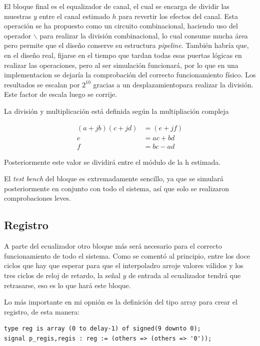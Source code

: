 \documentclass[11pt]{scrartcl} %
\begin{document}
\begin{preview}
El bloque final es el equalizador de canal, el cual se encarga de dividir las muestras $y$ entre el canal estimado $h$ para revertir los efectos del canal. Esta operación se ha propuesto como un circuito combinacional, haciendo uso del operador $\backslash$ para realizar la división combinacional, lo cual consume mucha área pero permite que el diseño conserve su estructura \emph{pipeline}. También habría que, en el diseño real, fijarse en el tiempo que tardan todas esas puertas lógicas en realizar las operaciones, pero al ser simulación funcionará, por lo que en una implementacion se dejaría la comprobación del correcto funcionamiento físico. Los resultados se escalan por $2^{10}$ gracias a un desplazamientopara realizar la división. Este factor de escala luego se corrije.

La división y multiplicación está definida según la multipliación compleja

\begin{equation} 
	\begin{split}
		(a + j b) (c +j d) &= (e + j f) \\
						e  &= a c + b d	\\
						f  &= b c - a d
	\end{split}
\end{equation}

Posteriormente este valor se dividirá entre el módulo de la h estimada.

El \emph{test bench} del bloque es extremadamente sencillo, ya que se simulará posteriormente en conjunto con todo el sistema, así que solo se realizaron comprobaciones leves.

\subsection{Registro}

A parte del ecualizador otro bloque más será necesario para el correcto funcionamiento de todo el sistema. Como se comentó al principio, entre los doce ciclos que hay que esperar para que el interpoladro arroje valores válidos y los tres ciclos de reloj de retardo, la señal $y$ de entrada al ecualizador tendrá que retrasarse, eso es lo que hará este bloque.

Lo más importante en mi opnión es la definición del tipo array para crear el registro, de esta manera:

\begin{verbatim}
type reg is array (0 to delay-1) of signed(9 downto 0);
signal p_regis,regis : reg := (others => (others => '0'));
\end{verbatim}


\end{preview}
\end{document}
